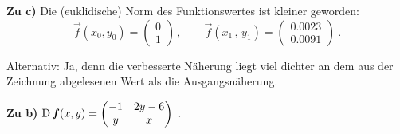 {\bigskip
\textbf{Zu c)} Die (euklidische) Norm des Funktionswertes ist kleiner geworden: \ 
 \[
\vec f(x_0,y_0) =  \begin{pmatrix} 0 \\ 1 \end{pmatrix} \,, \qquad  
\vec f(x_1\,,\,y_1) = \begin{pmatrix} 0.0023 \\ 0.0091 \end{pmatrix} \ .
\]

\medskip
Alternativ: Ja, denn die verbesserte Näherung liegt viel dichter an dem aus der 
Zeichnung abgelesenen Wert als die Ausgangsnäherung.
}


{
\textbf{Zu b)} $\text D\, \vec f(x,y) = \begin{pmatrix} -1 & 2y-6 \\ y & x \end{pmatrix}\ .$
}
